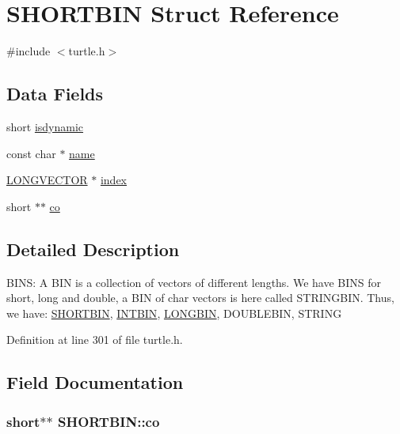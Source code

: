 \hypertarget{struct_s_h_o_r_t_b_i_n}{\section{S\-H\-O\-R\-T\-B\-I\-N Struct Reference}
\label{struct_s_h_o_r_t_b_i_n}
}


{\ttfamily \#include $<$turtle.\-h$>$}

\subsection*{Data Fields}
\begin{DoxyCompactItemize}
\item 
short \hyperlink{struct_s_h_o_r_t_b_i_n_a9b3e88c54f5acc347e5690e7a6ae7465}{isdynamic}
\item 
const char $\ast$ \hyperlink{struct_s_h_o_r_t_b_i_n_a6577de7330231f1d8df394f3e198253d}{name}
\item 
\hyperlink{struct_l_o_n_g_v_e_c_t_o_r}{L\-O\-N\-G\-V\-E\-C\-T\-O\-R} $\ast$ \hyperlink{struct_s_h_o_r_t_b_i_n_a9dfc172443543d0ae3175ade6effc6b3}{index}
\item 
short $\ast$$\ast$ \hyperlink{struct_s_h_o_r_t_b_i_n_af53f2e14d5478e3ff12641f4a55ffc62}{co}
\end{DoxyCompactItemize}


\subsection{Detailed Description}




B\-I\-N\-S\-: A B\-I\-N is a collection of vectors of different lengths. We have B\-I\-N\-S for short, long and double, a B\-I\-N of char vectors is here called S\-T\-R\-I\-N\-G\-B\-I\-N. Thus, we have\-: \hyperlink{struct_s_h_o_r_t_b_i_n}{S\-H\-O\-R\-T\-B\-I\-N}, \hyperlink{struct_i_n_t_b_i_n}{I\-N\-T\-B\-I\-N}, \hyperlink{struct_l_o_n_g_b_i_n}{L\-O\-N\-G\-B\-I\-N}, D\-O\-U\-B\-L\-E\-B\-I\-N, S\-T\-R\-I\-N\-G 

 

Definition at line 301 of file turtle.\-h.



\subsection{Field Documentation}
\hypertarget{struct_s_h_o_r_t_b_i_n_af53f2e14d5478e3ff12641f4a55ffc62}{
\subsubsection[{co}]{\setlength{\rightskip}{0pt plus 5cm}short$\ast$$\ast$ S\-H\-O\-R\-T\-B\-I\-N\-::co}}\label{struct_s_h_o_r_t_b_i_n_af53f2e14d5478e3ff12641f4a55ffc62}


